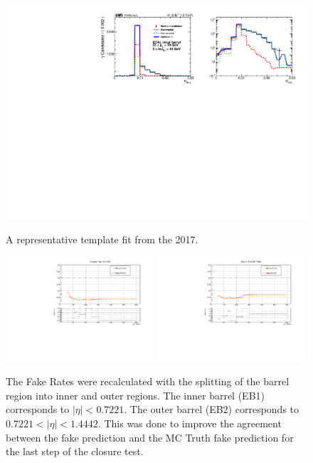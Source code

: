 \begin{figure}[!htbp]
\label{fig:kinematics18}
\end{figure}



\begin{figure}[!htbp]
\caption{A representative template fit from the 2017.}
\centering
\includegraphics[scale=0.85]{fig/fakeRatePlot_all_2017_EB1_pT50To70_chIso5To10.pdf}
\label{fig:templatefit_2017_etabinned}
\end{figure}

\begin{figure}[!htbp]
  \caption{The Fake Rates were recalculated with the splitting of the barrel region into inner and outer regions. The inner barrel (EB1) corresponds to $|\eta| <  0.7221$. The outer barrel (EB2) corresponds to $0.7221 < |\eta| < 1.4442$. This was done to improve the agreement between the fake prediction and the MC Truth fake prediction for the last step of the closure test.}
  \centering
  \includegraphics[width=0.49\textwidth]{fig/closureTest_MCTruth_comparisonsEB1_2017_adjustrange.pdf}
  \includegraphics[width=0.49\textwidth]{fig/closureTest_MCTruth_comparisonsEB2_2017_adjustrange.pdf}
  \label{fig:templates_2017_etaBinnedEB}
\end{figure}

